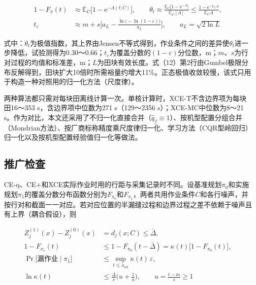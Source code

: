\documentclass[preprint,12pt,number,sort&compress]{elsarticle}
\begin{document}
\begin{equation}
\begin{aligned}
1-F_\pi(t)&\approx\mathbb E_C\big[1-\mathrm e^{-\Lambda(t;C)}\big],\qquad \theta_t\approx\frac{\mathbb E_C\big[1-\mathrm e^{-\Lambda}\big]}{\mathbb E_C[\Lambda]}\le\frac{1-\mathrm e^{-\mathbb E_C\Lambda}}{\mathbb E_C\Lambda},\\
t_\varepsilon&\approx m+s\Big[a_L-\frac{\ln\big(-\ln(1-\varepsilon)\big)}{a_L}\Big],\qquad a_L=\sqrt{2\ln L}
\end{aligned}
\end{equation}

式中：\(\theta_t\)为极值指数，其上界由Jensen不等式得到，作业条件之间的差异使\(\theta_t\)进一步降低，试验测得为0.30～0.66；\(t_\varepsilon\)为覆盖分数的\((1-\varepsilon)\)分位数，m；\(m\)、\(s\)为行对过程的均值和标准差，m；\(L\)为田块有效长度。式（12）第2行由Gumbel极限分布反解得到\citep{leadbetter1983}，田块扩大10倍时所需裕量约增大11\%。正态极值收敛较慢\citep{hall1979}，该式只用于构造一种对照用的归一化方法（尺度律）。

两种算法都只需对每块田离线计算一次。单核计算时，XCE-T不含边界项为每块田16～353 s，含边界项中位数为271 s（129～2356 s）；XCE-MC中位数为8～21 s。作为对比，本文还采用了不归一化直接合并（\(\hat q_f\equiv1\)）、按机型配置分组合并（Mondrian方法）、按厂商标称精度乘尺度律归一化、学习方法（CQR型岭回归\citep{romano2019}）归一化以及按机型配置经验值归一化等做法。

\subsection{推广检查}

CE-q、CE+和XCE实际作业时用的行距与采集记录时不同。设基准规划\(\pi_0\)和实施规划\(\pi_1\)的覆盖分数分布函数分别为\(F_{\pi_0}\)和\(F_{\pi_1}\)，两者共用作业条件\(C\)和各行噪声，并按行对和截面一一对应。若对应位置的半漏缝过程和边界过程之差不依赖于噪声且有上界（耦合假设），则

\begin{equation}
\begin{aligned}
Z^{(1)}_j(x)-Z^{(0)}_j(x)&=d_j(x;C)\le\bar\Delta,\\
1-F_{\pi_1}(t)&\le1-F_{\pi_0}(t-\bar\Delta)=\kappa(t)\big[1-F_{\pi_0}(t)\big],\\
\Pr\big[\text{漏作业}\mid\pi_1\big]&\le\sup_{t\le\lambda_\mathrm{ref}}\kappa(t)\,\varepsilon,\\
\ln\kappa(t)&\le\frac{\bar\Delta}{s}\Big(u+\frac1u\Big),\qquad u=\frac{t-m}{s}\ge1
\end{aligned}
\end{equation}
\end{document}
